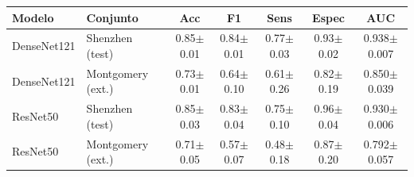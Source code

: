 \begin{tabular}{llccccc}
\toprule
Modelo & Conjunto & Acc & F1 & Sens & Espec & AUC \\
\midrule
DenseNet121 & Shenzhen (test) & 0.85$\pm$0.01 & 0.84$\pm$0.01 & 0.77$\pm$0.03 & 0.93$\pm$0.02 & 0.938$\pm$0.007 \\
DenseNet121 & Montgomery (ext.) & 0.73$\pm$0.01 & 0.64$\pm$0.10 & 0.61$\pm$0.26 & 0.82$\pm$0.19 & 0.850$\pm$0.039 \\
\midrule
ResNet50 & Shenzhen (test) & 0.85$\pm$0.03 & 0.83$\pm$0.04 & 0.75$\pm$0.10 & 0.96$\pm$0.04 & 0.930$\pm$0.006 \\
ResNet50 & Montgomery (ext.) & 0.71$\pm$0.05 & 0.57$\pm$0.07 & 0.48$\pm$0.18 & 0.87$\pm$0.20 & 0.792$\pm$0.057 \\
\bottomrule
\end{tabular}